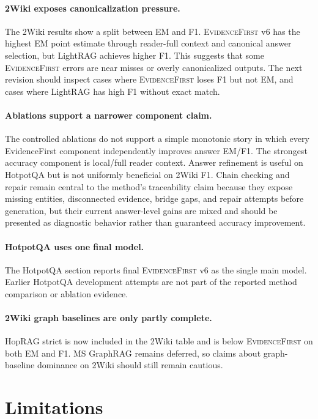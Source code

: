 \documentclass[runningheads]{llncs}
\newcommand{\sys}{\textsc{EvidenceFirst}\xspace}
\begin{document}
\paragraph{2Wiki exposes canonicalization pressure.}
The 2Wiki results show a split between EM and F1. \sys v6 has the highest EM
point estimate through reader-full context and canonical answer selection, but
LightRAG achieves higher F1. This suggests that some \sys errors are near misses
or overly canonicalized outputs. The next revision should inspect cases where
\sys loses F1 but not EM, and cases where LightRAG has high F1 without exact
match.

\paragraph{Ablations support a narrower component claim.}
The controlled ablations do not support a simple monotonic story in which every
EvidenceFirst component independently improves answer EM/F1. The strongest
accuracy component is local/full reader context. Answer refinement is useful on
HotpotQA but is not uniformly beneficial on 2Wiki F1. Chain checking and repair
remain central to the method's traceability claim because they expose missing
entities, disconnected evidence, bridge gaps, and repair attempts before
generation, but their current answer-level gains are mixed and should be
presented as diagnostic behavior rather than guaranteed accuracy improvement.

\paragraph{HotpotQA uses one final model.}
The HotpotQA section reports final \sys v6 as the single main model. Earlier
HotpotQA development attempts are not part of the reported method comparison
or ablation evidence.

\paragraph{2Wiki graph baselines are only partly complete.}
HopRAG strict is now included in the 2Wiki table and is below \sys on both EM
and F1. MS GraphRAG remains deferred, so claims about graph-baseline dominance
on 2Wiki should still remain cautious.

\section{Limitations}
\label{sec:limitations}
\end{document}
